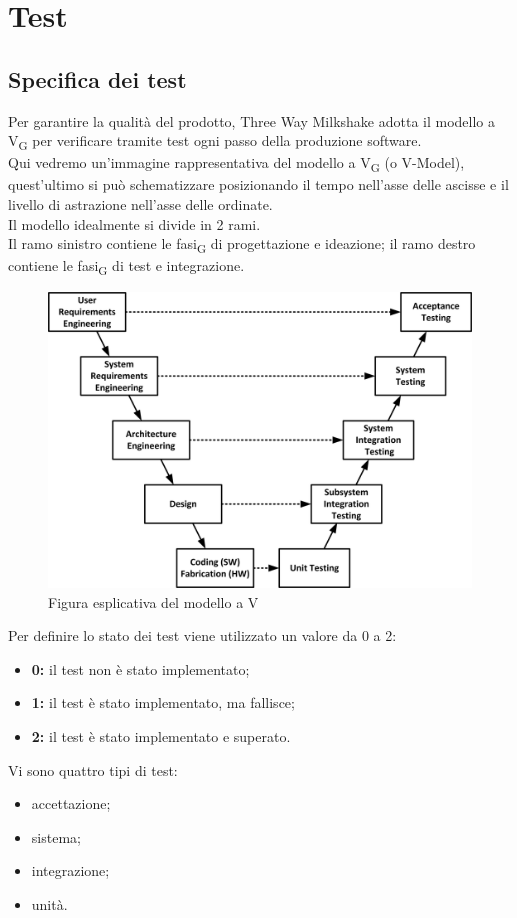 \section{Test}

\subsection{Specifica dei test}

Per garantire la qualità del prodotto, Three Way Milkshake adotta il modello a V\textsubscript{G} per verificare tramite test ogni passo della produzione software.\\Qui vedremo un'immagine rappresentativa del modello a V\textsubscript{G} (o V-Model), quest'ultimo si può schematizzare posizionando il tempo nell'asse delle ascisse e il livello di astrazione nell'asse delle ordinate.\\Il modello idealmente si divide in 2 rami.\\Il ramo sinistro contiene le fasi\textsubscript{G} di progettazione e ideazione; il ramo destro contiene le fasi\textsubscript{G} di test e integrazione.
\begin{figure}[h!]
	\centering
	\includegraphics[scale=0.6]{res/images/v_model.jpg}
	\caption{Figura esplicativa del {modello a V}}
\end{figure}
\newline
Per definire lo stato dei test viene utilizzato un valore da 0 a 2:
\begin{itemize}
	\item \textbf{0:} il test non è stato implementato;
	\item \textbf{1:} il test è stato implementato, ma fallisce;
	\item \textbf{2:} il test è stato implementato e superato.
\end{itemize}
Vi sono quattro tipi di test:
\begin{itemize}
	\item accettazione;
	\item sistema;
	\item integrazione;
	\item unità.
\end{itemize}

